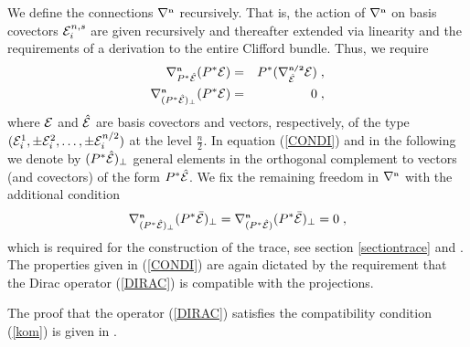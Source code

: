 \documentclass[12pt]{article}
\newcommand{\ba}{\begin{eqnarray}}
\newcommand{\ea}{\end{eqnarray}}
\newcommand{\nn}{\nonumber}
\def\ce{{\cal E}}
\newtheorem{proposition}[thm]{Proposition}
\begin{document}
We define the connections $\nabla^{\mbox{\tiny\bf n}}$ recursively. That is, the action of $\nabla^{\mbox{\tiny\bf n}}$ on basis covectors $\ce^{n,s}_i$ are given recursively and thereafter extended via linearity and the requirements of a derivation to the entire Clifford bundle. Thus, we require
\ba
\nabla^{\mbox{\tiny\bf n}}_{P^*\hat{\ce}}(P^*\ce)&=&P^*(\nabla^{\mbox{\tiny\bf n/2}}_{\hat{\ce}} \ce)\;,
\nn\\
\nabla^{\mbox{\tiny\bf n}}_{(P^*\hat{\ce})_{\perp}}(P^*\ce)&=&0\;,
\label{CONDI}
\ea
where $\ce$ and $\hat{\ce}$ are basis covectors and vectors, respectively, of the type $(\ce^1_i,\pm\ce^2_i,\ldots,\pm\ce^{n/2}_i)$ at the level $\frac{n}{2}$. In equation (\ref{CONDI}) and in the following we denote by $(P^*\hat{\ce})_{\perp}$ general elements in the orthogonal complement to vectors (and covectors) of the form $P^*\hat{\ce}$.
We fix the remaining freedom in $\nabla^{\mbox{\tiny\bf n}}$ with the additional condition
\[
\nabla^{\mbox{\tiny\bf n}}_{(P^*\hat{\ce})_{\perp}}(P^*\bar{\ce})_{\perp} = \nabla^{\mbox{\tiny\bf n}}_{(P^*\hat{\ce})}(P^*\bar{\ce})_{\perp}=0\;,
\]
which is required for the construction of the trace, see section \ref{sectiontrace} and 
\cite{Aastrup}. The properties given in (\ref{CONDI}) are again dictated by the requirement that the Dirac operator (\ref{DIRAC}) is compatible with the projections.

The proof that the operator (\ref{DIRAC}) satisfies the compatibility condition (\ref{kom}) is given in \cite{Aastrup}.








\end{document}
